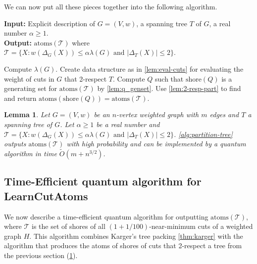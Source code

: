 \documentclass[10pt,a4paper]{article}
\newcommand{\Tcal}{\mathcal{T}}
\newcommand{\atoms}{\mathrm{atoms}}
\newcommand{\shore}{\mathrm{shore}}
\newcommand{\tO}{\tilde O}
\newcommand{\1}{\mathbf{1}}
\newtheorem{lemma}[theorem]{Lemma}
\theoremstyle{definition}
\begin{document}
We can now put all these pieces together into the following algorithm.
\begin{algorithm}[H]
\caption{Algorithm for finding atoms of the shores of 2-respecting near-minimum cuts}
\label{alg:partition-tree}
 \hspace*{\algorithmicindent} \textbf{Input:} Explicit description of $G=(V,w)$, a spanning tree $T$ of $G$, a real number $\alpha \ge 1$. \\
 \hspace*{\algorithmicindent} \textbf{Output:} $\atoms(\Tcal)$ where $\Tcal = \{X: w(\Delta_G(X)) \le \alpha \lambda(G) \mbox{ and } |\Delta_T(X)| \le 2\}$.
\begin{algorithmic}[1]
\State
Compute $\lambda(G)$.
\State
Create data structure as in \cref{lem:eval-cuts} for evaluating the weight of cuts in $G$ that 2-respect $T$.
\State
Compute $Q$ such that $\shore(Q)$ is a generating set for $\atoms(\Tcal)$ by \cref{lem:q_genset}.
\State
Use \cref{lem:2-resp-part} to find and return $\atoms(\shore(Q)) = \atoms(\Tcal)$.
\end{algorithmic}
\end{algorithm}

\begin{lemma} \label{lemma:2-respect}
Let $G=(V,w)$ be an $n$-vertex weighted graph with $m$ edges and $T$ a spanning tree of $G$.  Let $\alpha \ge 1$ be a real number and
$\Tcal = \{X: w(\Delta_G(X)) \le \alpha \lambda(G) \mbox{ and } |\Delta_T(X)| \le 2\}$.  
\cref{alg:partition-tree} outputs $\atoms(\Tcal)$ with high probability and can be implemented by a quantum algorithm in time $\tO(m + n^{3/2})$.
\end{lemma}

\subsection{Time-Efficient quantum algorithm for LearnCutAtoms}
We now describe a time-efficient quantum algorithm for outputting $\atoms(\Tcal)$, where $\Tcal$ is the set of shores of all $(1+1/100)$-near-minimum cuts of a weighted graph $H$.
This algorithm combines Karger's tree packing \cref{thm:karger} with the algorithm that produces the atoms of shores of cuts that 2-respect a tree from the previous section (\cref{lemma:2-respect}).
\end{document}
